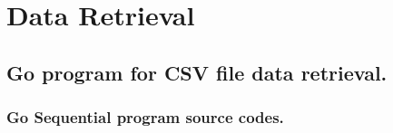 \chapter{Data Retrieval} 
\label{AppendixL} 


\section{Go program for CSV file data retrieval.}

\subsection{Go Sequential program source codes.}

